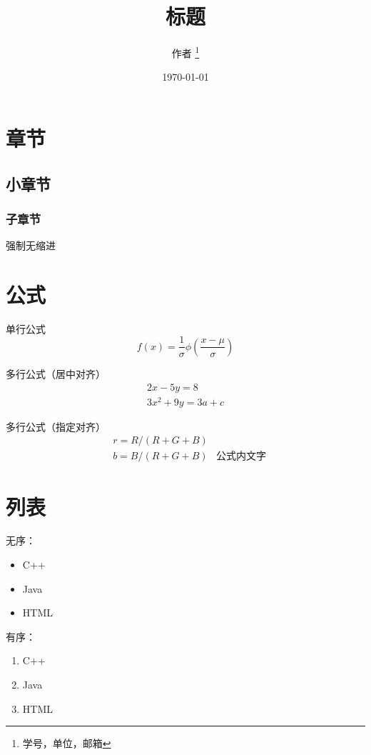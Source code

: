 \documentclass[12pt,a4paper]{article}
\title{标题}
\author{
	作者 \thanks{学号，单位，邮箱} %
}
\date{\today}
\begin{document}
\maketitle

\section{章节}
\subsection{小章节}
\subsubsection{子章节}

\noindent 强制无缩进 


\section{公式}
单行公式
\begin{equation}
f(x) = \frac{1}{\sigma} \phi\left(\frac{x-\mu}{\sigma}\right)
\end{equation}

多行公式（居中对齐）
\begin{gather*} 
2x - 5y =  8 \\ 
3x^2 + 9y =  3a + c
\end{gather*}

多行公式（指定对齐）
\begin{align} %
& r = R/(R+G+B) & \nonumber \\
& b = B/(R+G+B) & \text{公式内文字} %
\end{align}


\section{列表}
无序：
\begin{itemize}
\item  C++
\item  Java
\item  HTML
\end{itemize}

有序：
\begin{enumerate}
\item  C++
\item  Java
\item  HTML
\end{enumerate}
\end{document}
